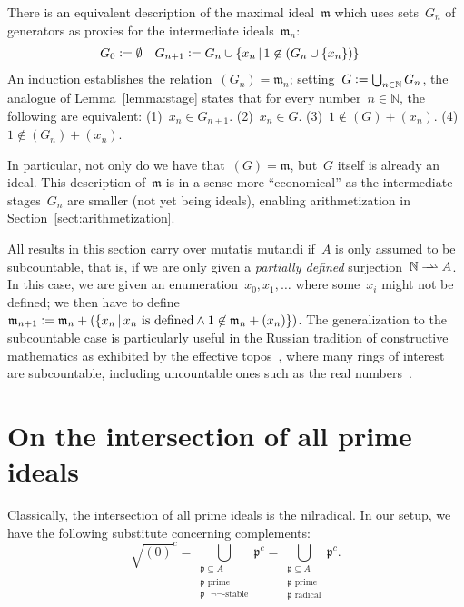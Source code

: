 \documentclass[envcountsect,envcountsame,runningheads]{llncs}
\newcommand{\mmm}{\mathfrak{m}}
\newcommand{\ppp}{\mathfrak{p}}
\newcommand{\NN}{\mathbb{N}}
\newcommand{\defeq}{\vcentcolon=}
\renewcommand{\_}{\mathpunct{.}\,}
\begin{document}
\begin{remark}\label{rem:via-generators}There is an equivalent description of the
maximal ideal~$\mmm$ which uses sets~$G_n$ of generators as proxies for the
intermediate ideals~$\mmm_n$:
\begin{align*}
  G_0 &\defeq \emptyset &
  G_{n+1} &\defeq G_n \cup \{ x_n \,|\, 1 \not\in (G_n \cup \{ x_n \}) \}
\end{align*}
An induction establishes the relation~$(G_n) = \mmm_n$; setting~$G \defeq
\bigcup_{n\in\NN} G_n$, the analogue of Lemma~\ref{lemma:stage} states
that for every number~$n \in \NN$, the following are equivalent:
(1)~$x_n \in G_{n+1}$.
(2)~$x_n \in G$.
(3)~$1 \not\in (G) + (x_n)$.
(4)~$1 \not\in (G_n) + (x_n)$.

In particular, not only do we have that~$(G) = \mmm$, but~$G$ itself is already
an ideal. This description of~$\mmm$ is in a sense more ``economical'' as the
intermediate stages~$G_n$ are smaller (not yet being ideals), enabling
arithmetization in Section~\ref{sect:arithmetization}.
\end{remark}

\newcommand{\rightrightharpoonup}{\mathrel{\mathrlap{\rightharpoonup}\mkern1mu\rightharpoonup}}
\begin{remark}All results in this section carry over mutatis mutandi if~$A$ is
only assumed to be subcountable, that is, if we are only
given a \emph{partially defined} surjection~$\NN \rightrightharpoonup A$. In
this case, we are given an enumeration~$x_0,x_1,\ldots$ where some~$x_i$
might not be defined; we then have to define~$\mmm_{n+1} \defeq
\mmm_n + (\{ x_n \,|\, \text{$x_n$ is defined} \wedge 1 \not\in \mmm_n + (x_n) \})$.
The generalization to the subcountable case is particularly useful in the
Russian tradition of constructive mathematics as exhibited by the ef{}fective
topos~\cite{hyland:effective-topos,oosten:realizability,phoa:effective,bauer:c2c},
where many rings of interest are subcountable, including uncountable ones such as the real
numbers~\cite[Prop.~7.2]{hyland:effective-topos}.
\end{remark}


\section{On the intersection of all prime ideals}

Classically, the intersection of all prime ideals is the
nilradical. In our setup, we have the following substitute concerning complements:
\[ \sqrt{(0)}^c =
  \bigcup_{\substack{\text{$\ppp \subseteq A$}\\\text{$\ppp$ prime}\\\text{$\ppp$ $\neg\neg$-stable}}} \ppp^c =
  \bigcup_{\substack{\text{$\ppp \subseteq A$}\\\text{$\ppp$ prime}\\\text{$\ppp$ radical}}} \ppp^c. \]
\end{document}
